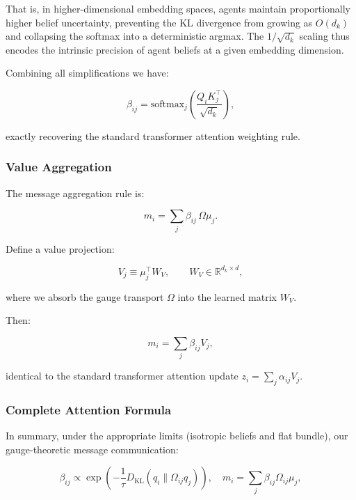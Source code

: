 \documentclass[twoside,11pt]{article}
\begin{document}
That is, in higher-dimensional embedding spaces, agents maintain proportionally higher belief uncertainty, preventing the KL divergence from growing as $O(d_k)$ and collapsing the softmax into a deterministic argmax. The $1/\sqrt{d_k}$ scaling thus encodes the intrinsic precision of agent beliefs at a given embedding dimension.

Combining all simplifications we have:

\begin{equation}
\boxed{\beta_{ij} = \mathrm{softmax}_j\left(\frac{Q_i K_j^\top}{\sqrt{d_k}}\right)},
\end{equation}

exactly recovering the standard transformer attention weighting rule.

\subsubsection{Value Aggregation}

The message aggregation rule is:

\begin{equation}
m_i = \sum_j \beta_{ij} \,\Omega\mu_j.
\end{equation}

Define a value projection:

\begin{equation}
V_j \equiv \mu_j^\top W_V, \qquad W_V \in \mathbb{R}^{d_k \times d},
\end{equation}

where we absorb the gauge transport $\Omega$ into the learned matrix $W_V$.

Then:

\begin{equation}
\boxed{m_i = \sum_j \beta_{ij} V_j},
\end{equation}

identical to the standard transformer attention update $z_i = \sum_j \alpha_{ij} V_j$.

\subsubsection{Complete Attention Formula}

In summary, under the appropriate limits (isotropic beliefs and flat bundle), our gauge-theoretic message communication:

\begin{equation}
\beta_{ij} \propto \exp\left(-\frac{1}{\tau}D_{\mathrm{KL}}(q_i \| \Omega_{ij} q_j)\right), \quad m_i = \sum_j \beta_{ij} \Omega_{ij}\mu_j,
\end{equation}
\end{document}
